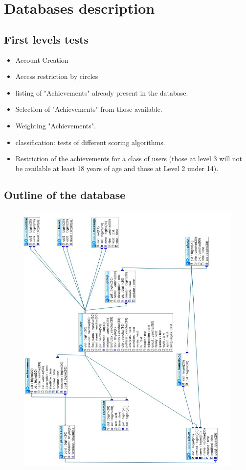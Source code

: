 \documentclass{life-fr}
\begin{document}
\chapter{Databases description}

\section{First levels tests}

\begin{itemize}
  \item Account Creation
  \item Access restriction by circles
  \item listing of "Achievements" already present in the database.
  \item Selection of "Achievements" from those available.
  \item Weighting "Achievements".
  \item classification: tests of different scoring algorithms.
  \item Restriction of the achievements for a class of users (those at level 3 will not be available at least 18 years of age and those at Level 2 under 14).
\end{itemize}

\section{Outline of the database}

\begin{figure}[H]
  \begin{center}
    \includegraphics[width=18cm]{img/imgdb.jpg}
  \end{center}
\end{figure}
\end{document}
